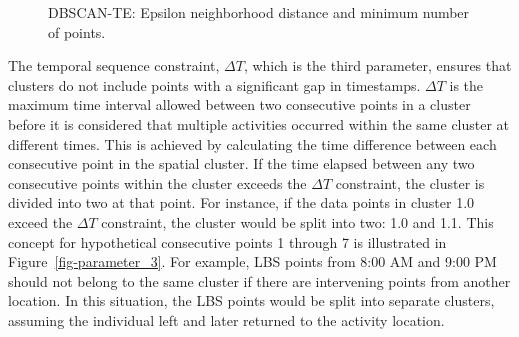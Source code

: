 \documentclass[
  letterpaper,
  number,
  review,
  3p]{elsarticle}
\begin{document}
\begin{figure}[H]


\caption{\label{fig-parameters_1_2}DBSCAN-TE: Epsilon neighborhood
distance and minimum number of points.}

\end{figure}%

The temporal sequence constraint, \(\Delta T\), which is the third
parameter, ensures that clusters do not include points with a
significant gap in timestamps. \(\Delta T\) is the maximum time interval
allowed between two consecutive points in a cluster before it is
considered that multiple activities occurred within the same cluster at
different times. This is achieved by calculating the time difference
between each consecutive point in the spatial cluster. If the time
elapsed between any two consecutive points within the cluster exceeds
the \(\Delta T\) constraint, the cluster is divided into two at that
point. For instance, if the data points in cluster 1.0 exceed the
\(\Delta T\) constraint, the cluster would be split into two: 1.0 and
1.1. This concept for hypothetical consecutive points 1 through 7 is
illustrated in Figure~\ref{fig-parameter_3}. For example, LBS points
from 8:00 AM and 9:00 PM should not belong to the same cluster if there
are intervening points from another location. In this situation, the LBS
points would be split into separate clusters, assuming the individual
left and later returned to the activity location.
\end{document}
